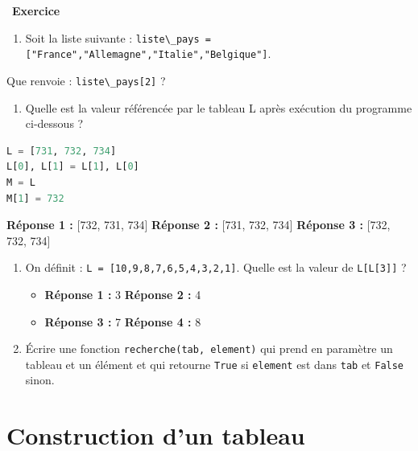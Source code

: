 \documentclass[
  11pt,
]{article}
\newcommand{\passthrough}[1]{#1}
\providecommand{\tightlist}{%
  \setlength{\itemsep}{0pt}\setlength{\parskip}{0pt}}
\newcounter{exo}
\newenvironment{exercice}[1]
{\par \medskip   \addtocounter{exo}{1} \noindent  
\begin{bclogo}[arrondi =0.1,   noborder = true, logo=\bccrayon, marge=4]{~\textbf{Exercice} \textbf{\theexo} {\itshape #1} }  \par}
{
\end{bclogo}
 \par \bigskip }
\newcounter{def}
\newcounter{prog}
\begin{document}
\begin{exercice}{}

\begin{enumerate}
\def\labelenumi{\arabic{enumi}.}
\tightlist
\item
  Soit la liste suivante :
  \passthrough{\lstinline!liste\_pays = ["France","Allemagne","Italie","Belgique"]!}.
\end{enumerate}

Que renvoie : \passthrough{\lstinline!liste\_pays[2]!} ?

\begin{enumerate}
\def\labelenumi{\arabic{enumi}.}
\setcounter{enumi}{1}
\tightlist
\item
  Quelle est la valeur référencée par le tableau L après exécution du
  programme ci-dessous ?
\end{enumerate}

\begin{lstlisting}[language=Python]
L = [731, 732, 734]
L[0], L[1] = L[1], L[0]
M = L
M[1] = 732
\end{lstlisting}

\textbf{Réponse 1 :} {[}732, 731, 734{]} \textbf{Réponse 2 :} {[}731,
732, 734{]} \textbf{Réponse 3 :} {[}732, 732, 734{]}

\begin{enumerate}
\def\labelenumi{\arabic{enumi}.}
\setcounter{enumi}{2}
\item
  On définit : \passthrough{\lstinline!L = [10,9,8,7,6,5,4,3,2,1]!}.
  Quelle est la valeur de \passthrough{\lstinline!L[L[3]]!} ?

  \begin{itemize}
  \tightlist
  \item
    \textbf{Réponse 1 :} 3 \textbf{Réponse 2 :} 4
  \item
    \textbf{Réponse 3 :} 7 \textbf{Réponse 4 :} 8
  \end{itemize}
\item
  Écrire une fonction \passthrough{\lstinline!recherche(tab, element)!}
  qui prend en paramètre un tableau et un élément et qui retourne
  \passthrough{\lstinline!True!} si \passthrough{\lstinline!element!}
  est dans \passthrough{\lstinline!tab!} et
  \passthrough{\lstinline!False!} sinon.
\end{enumerate}

\end{exercice}

\hypertarget{construction-dun-tableau}{%
\section{Construction d'un tableau}\label{construction-dun-tableau}}
\end{document}
